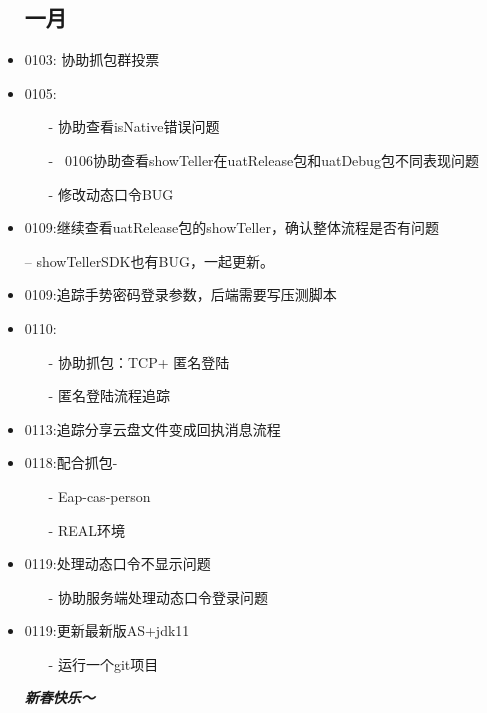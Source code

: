 \documentclass[12pt,a4paper]{ctexart}
\begin{document}
\begin{itemize}
		\subsection{一月}
		\item 0103: 协助抓包群投票
		\item 0105:
		\begin{itemize}
			\item[-] 协助查看isNative错误问题
			\item[-] ~0106协助查看showTeller在uatRelease包和uatDebug包不同表现问题
			\item[-] 修改动态口令BUG
		\end{itemize}
		\item 0109:继续查看uatRelease包的showTeller，确认整体流程是否有问题
		\item[--] showTellerSDK也有BUG，一起更新。
		\item 0109:追踪手势密码登录参数，后端需要写压测脚本
		\newpage
		\item 0110:
		\begin{itemize}
			\item[-] 协助抓包：TCP+ 匿名登陆
			\item[-] 匿名登陆流程追踪
		\end{itemize}
		\item 0113:追踪分享云盘文件变成回执消息流程
		\item 0118:配合抓包-
		\begin{itemize}
			\item[-] Eap-cas-person
			\item[-] REAL环境
		\end{itemize}
		
		\item 0119:处理动态口令不显示问题
		\begin{itemize}
			\item[-] 协助服务端处理动态口令登录问题
		\end{itemize}
		\item 0119:更新最新版AS+jdk11
		\begin{itemize}
			\item[-] 运行一个git项目
		\end{itemize}
		\emph{\large{\textbf {新春快乐～}}}
		
	\end{itemize}
\end{document}
